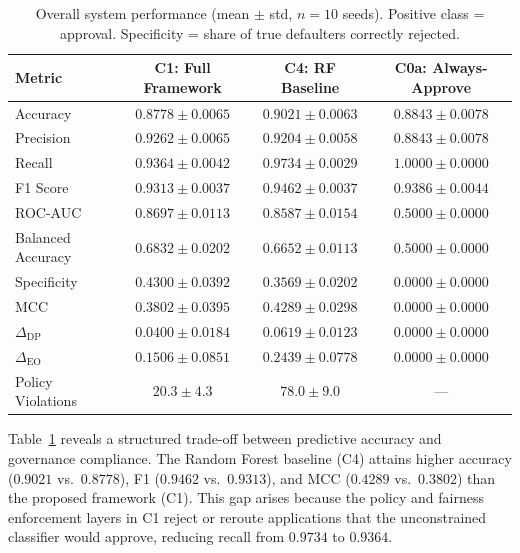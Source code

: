 \begin{table}[htbp]
\centering
\caption{Overall system performance (mean $\pm$ std, $n{=}10$ seeds).
Positive class = approval. Specificity = share of true defaulters correctly
rejected.}
\label{tab:overall}
\setlength{\tabcolsep}{3pt}
\begin{tabular}{lccc}
\hline
\textbf{Metric} & \textbf{C1: Full Framework} & \textbf{C4: RF Baseline} & \textbf{C0a: Always-Approve} \\
\hline
Accuracy            & $0.8778 \pm 0.0065$ & $\mathbf{0.9021 \pm 0.0063}$ & $0.8843 \pm 0.0078$ \\
Precision           & $\mathbf{0.9262 \pm 0.0065}$ & $0.9204 \pm 0.0058$ & $0.8843 \pm 0.0078$ \\
Recall              & $0.9364 \pm 0.0042$ & $\mathbf{0.9734 \pm 0.0029}$ & $\mathbf{1.0000 \pm 0.0000}$ \\
F1 Score            & $0.9313 \pm 0.0037$ & $\mathbf{0.9462 \pm 0.0037}$ & $0.9386 \pm 0.0044$ \\
ROC-AUC             & $\mathbf{0.8697 \pm 0.0113}$ & $0.8587 \pm 0.0154$ & $0.5000 \pm 0.0000$ \\
Balanced Accuracy   & $\mathbf{0.6832 \pm 0.0202}$ & $0.6652 \pm 0.0113$ & $0.5000 \pm 0.0000$ \\
Specificity         & $\mathbf{0.4300 \pm 0.0392}$ & $0.3569 \pm 0.0202$ & $0.0000 \pm 0.0000$ \\
MCC                 & $0.3802 \pm 0.0395$ & $\mathbf{0.4289 \pm 0.0298}$ & $0.0000 \pm 0.0000$ \\
$\Delta_{\text{DP}}$ & $\mathbf{0.0400 \pm 0.0184}$ & $0.0619 \pm 0.0123$ & $0.0000 \pm 0.0000$ \\
$\Delta_{\text{EO}}$ & $\mathbf{0.1506 \pm 0.0851}$ & $0.2439 \pm 0.0778$ & $0.0000 \pm 0.0000$ \\
Policy Violations   & $\mathbf{20.3 \pm 4.3}$ & $78.0 \pm 9.0$ & --- \\
\hline
\end{tabular}
\end{table}

Table~\ref{tab:overall} reveals a structured trade-off between predictive
accuracy and governance compliance. The Random Forest baseline (C4) attains
higher accuracy ($0.9021$ vs.\ $0.8778$), F1 ($0.9462$ vs.\ $0.9313$), and
MCC ($0.4289$ vs.\ $0.3802$) than the proposed framework (C1). This gap
arises because the policy and fairness enforcement layers in C1 reject or
reroute applications that the unconstrained classifier would approve,
reducing recall from $0.9734$ to $0.9364$.

